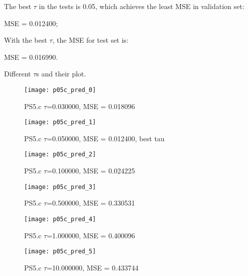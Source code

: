 \begin{answer}

The best $\tau$ in the tests is 0.05, which achieves the least MSE in validation set:

MSE = 0.012400;

With the best $\tau$, the MSE for test set is:

MSE = 0.016990.


Different $\tau$s and their plot. 
\begin{figure}[h]
    \centering
    \texttt{[image: p05c\_pred\_0]}
    \caption{PS5.c $\tau$=0.030000, MSE = 0.018096}
\end{figure}

\begin{figure}[h]
    \centering
    \texttt{[image: p05c\_pred\_1]}
    \caption{PS5.c $\tau$=0.050000, MSE = 0.012400, best tau}
\end{figure}

\begin{figure}[h]
    \centering
    \texttt{[image: p05c\_pred\_2]}
    \caption{PS5.c $\tau$=0.100000, MSE = 0.024225}
\end{figure}

\begin{figure}[h]
    \centering
    \texttt{[image: p05c\_pred\_3]}
    \caption{PS5.c $\tau$=0.500000, MSE = 0.330531}
\end{figure}

\begin{figure}[h]
    \centering
    \texttt{[image: p05c\_pred\_4]}
    \caption{PS5.c $\tau$=1.000000, MSE = 0.400096}
\end{figure}

\begin{figure}[h]
    \centering
    \texttt{[image: p05c\_pred\_5]}
    \caption{PS5.c $\tau$=10.000000, MSE = 0.433744}
\end{figure}

\end{answer}
